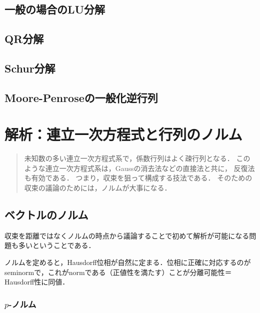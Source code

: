 \documentclass[uplatex, dvipdfmx]{jsreport}
\begin{document}
\section{一般の場合のLU分解}

\section{QR分解}

\section{Schur分解}

\section{Moore-Penroseの一般化逆行列}

\chapter{解析：連立一次方程式と行列のノルム}

\begin{quotation}
    未知数の多い連立一次方程式系で，係数行列はよく疎行列となる．
    このような連立一次方程式系は，Gaussの消去法などの直接法と共に，
    反復法も有効である．
    つまり，収束を狙って構成する技法である．
    そのための収束の議論のためには，ノルムが大事になる．
\end{quotation}

\section{ベクトルのノルム}

\begin{tcolorbox}[colframe=ForestGreen, colback=ForestGreen!10!white,breakable,colbacktitle=ForestGreen!40!white,coltitle=black,fonttitle=\bfseries\sffamily,
title=]
    収束を距離ではなくノルムの時点から議論することで初めて解析が可能になる問題も多いということである．

    ノルムを定めると，Hausdorff位相が自然に定まる．位相に正確に対応するのがseminormで，これがnormである（正値性を満たす）ことが分離可能性＝Hausdorff性に同値．
\end{tcolorbox}

\subsection{$p$-ノルム}
\end{document}
